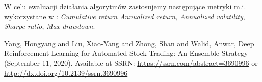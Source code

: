 \documentclass[12pt,a4paper]{article}
\begin{document}
W celu ewaluacji działania algorytmów zastosujemy następujące metryki
m.i. wykorzystane w \cite{ensemble_strat}: \emph{Cumulative return} 
\emph{Annualized return}, \emph{Annualized volatility}, \emph{Sharpe ratio},
\emph{Max drawdown}.

\pagebreak

\begin{thebibliography}{9}
Yang, Hongyang and Liu, Xiao-Yang and Zhong, Shan and Walid, Anwar, 
Deep Reinforcement Learning for Automated Stock Trading: An Ensemble 
Strategy (September 11, 2020). Available at SSRN: 
\href{https://ssrn.com/abstract=3690996}{https://ssrn.com/abstract=3690996}
or \href{http://dx.doi.org/10.2139/ssrn.3690996}{http://dx.doi.org/10.2139/ssrn.3690996}
\end{thebibliography}
  
\end{document}
